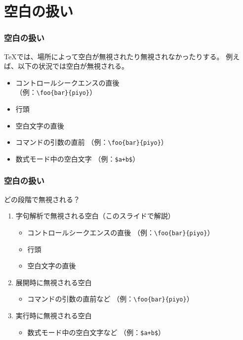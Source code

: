 \documentclass{beamer}
\begin{document}
\section{空白の扱い}

\begin{frame}\frametitle{空白の扱い}
  \TeX では、場所によって空白が無視されたり無視されなかったりする。
  例えば、以下の状況では空白が無視される。
  \begin{itemize}
  \item コントロールシークエンスの直後 \\
    （例：\texttt{\textbackslash foo\ignoredspace\{bar\}\textvisiblespace\{piyo\}}）
  \item 行頭
  \item 空白文字の直後
  \item コマンドの引数の直前
    （例：\texttt{\textbackslash foo\textvisiblespace\{bar\}\ignoredspace\{piyo\}}）
  \item 数式モード中の空白文字
    （例：\texttt{\$\ignoredspace a+b\ignoredspace\$}）
  \end{itemize}
\end{frame}

\begin{frame}\frametitle{空白の扱い}
  どの段階で無視される？
  \begin{enumerate}
  \item 字句解析で無視される空白（このスライドで解説）
    \begin{itemize}
    \item コントロールシークエンスの直後
      （例：\texttt{\textbackslash foo\ignoredspace\{bar\}\textvisiblespace\{piyo\}}）
    \item 行頭
    \item 空白文字の直後
    \end{itemize}
  \item 展開時に無視される空白
    \begin{itemize}
    \item コマンドの引数の直前など
      （例：\texttt{\textbackslash foo\textvisiblespace\{bar\}\ignoredspace\{piyo\}}）
    \end{itemize}
  \item 実行時に無視される空白
    \begin{itemize}
    \item 数式モード中の空白文字など
      （例：\texttt{\$\ignoredspace a+b\ignoredspace\$}）
    \end{itemize}
  \end{enumerate}
\end{frame}
\end{document}
